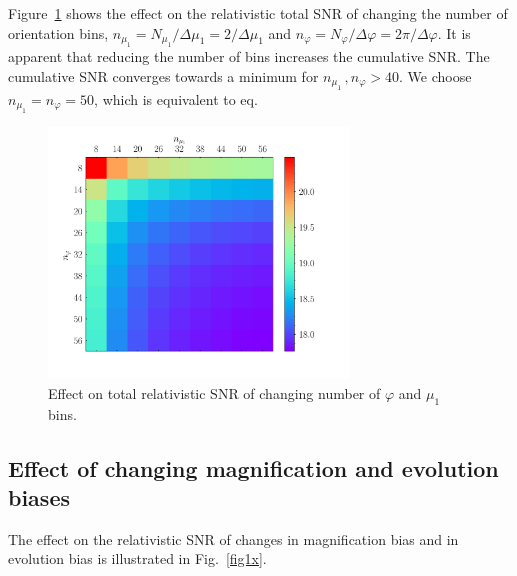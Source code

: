Figure~\ref{fig4x} 
shows the effect on the 
relativistic 
total SNR of changing the number of orientation bins, $n_{\mu_1}=N_{\mu_1}/\Delta{\mu_1}=2 /\Delta{\mu_1}$  and $n_\varphi=N_\varphi/\Delta\varphi =2\pi/\Delta\varphi$. It is apparent 
that reducing the number of bins increases the cumulative SNR. The cumulative SNR 
converges towards a minimum for 
$n_{\mu_{1}}\,, n_{\varphi} > 40$.
We choose $n_{\mu_{1}}= n_{\varphi}=50$, which is equivalent to eq.
\begin{figure}[ht]
\centering
\includegraphics[width=8.0cm]{fig/colournmu1nphi_Doppler-eps-converted-to} 
\caption{Effect on 
{total} relativistic SNR of changing number of  $\varphi$ and $\mu_1$ bins. 
} \label{fig4x}
\end{figure} 


\subsection*{{Effect of changing magnification and evolution biases}}

The effect on the relativistic SNR of changes in magnification bias and in evolution bias is illustrated in Fig.~\ref{fig1x}.

